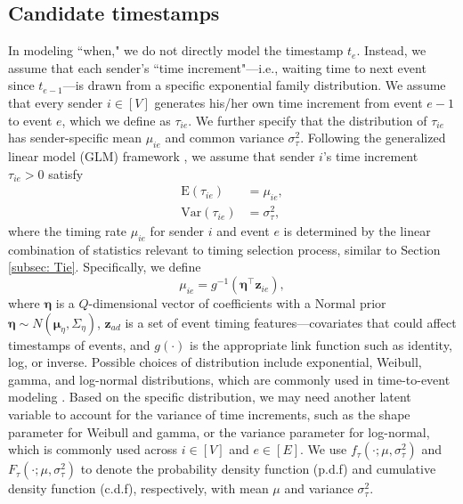 \documentclass[ba]{imsart}
\numberwithin{equation}{section}
\theoremstyle{plain}
\begin{document}
	\subsection{Candidate timestamps}\label{subsec:Time}	
	 In modeling ``when," we do not directly model the timestamp $t_e$. Instead, we assume that each sender's ``time increment"---i.e., waiting time to next event since $t_{e-1}$---is drawn from a specific exponential family distribution. We assume that every sender $i \in [V]$ generates his/her own time increment from event $e-1$ to event $e$, which we define as $\tau_{ie}$. We further specify that the distribution of $\tau_{ie}$ has sender-specific mean $\mu_{ie}$ and common variance $\sigma_\tau^2$. Following the generalized linear model (GLM) framework \citep{nelder1972generalized}, we assume that sender $i$'s time increment $\tau_{ie} > 0$ satisfy~
	\begin{equation}
		\begin{aligned}
\mbox{E}(\tau_{ie}) &= \mu_{ie},\\
\mbox{Var}(\tau_{ie}) &= \sigma_\tau^2,
		\end{aligned}
	\end{equation}
	where the timing rate $\mu_{ie}$ for sender $i$ and event $e$ is determined by the linear combination of statistics relevant to timing selection process, similar to Section \ref{subsec: Tie}. Specifically, we define
	\begin{equation}
		\mu_{ie} = g^{-1}(\boldsymbol{\eta}^\top \boldsymbol{z}_{ie}),
	\end{equation}
	where $\boldsymbol{\eta}$ is a $Q$-dimensional vector of coefficients with a Normal prior $\boldsymbol{\eta} \sim N(\boldsymbol{\mu}_\eta,\Sigma_\eta)$, $\boldsymbol{z}_{ad}$ is a set of event timing features---covariates that could affect timestamps of events, and $g(\cdot)$ is the appropriate link function such as identity, log, or inverse. Possible choices of distribution include exponential, Weibull, gamma, and log-normal distributions, which are commonly used in time-to-event modeling \citep{rao2000applied,rizopoulos2012joint}. Based on the specific distribution, we may need another latent variable to account for the variance of time increments, such as the shape parameter for Weibull and gamma, or the variance parameter for log-normal, which is commonly used across $i\in [V]$ and $e \in [E]$. We use $f_\tau(\cdot; \mu, \sigma_\tau^2)$ and $F_\tau(\cdot; \mu, \sigma_\tau^2)$ to denote the probability density function (p.d.f) and cumulative density function (c.d.f), respectively, with mean $\mu$ and variance $\sigma_\tau^2$. 
\end{document}
